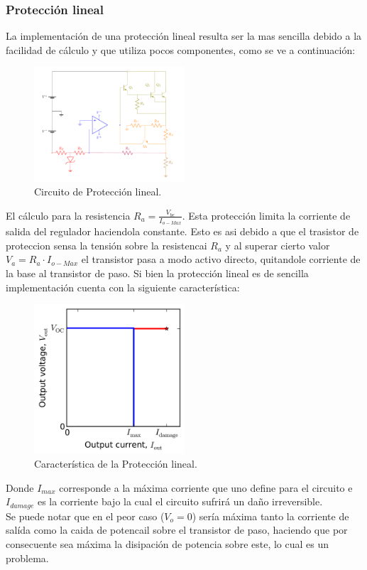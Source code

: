 \subsubsection{Protección lineal}
La implementación de una protección lineal resulta ser la mas sencilla debido a la facilidad de cálculo y que utiliza pocos componentes, como se ve a continuación:
\begin{figure}[H]
\centering
	\includegraphics[width=0.5\textwidth, page=3]{ImagenesEjercicio2/Regulador.pdf}
	\caption{Circuito de Protección lineal.}
	\label{fig:circuitolineal}
\end{figure}

El cálculo para la resistencia $R_a= \frac{V_{be}}{I_{o-Max}}$.
Esta protección limita la corriente de salida del regulador haciendola constante. Esto es asi debido a que el trasistor de proteccion sensa la tensión sobre la resistencai $R_a$ y al superar cierto valor $V_a = R_a \cdot I_{o-Max} $ el transistor pasa a modo activo directo, quitandole corriente de la base al transistor de paso.
Si bien la protección lineal es de sencilla implementación cuenta con la siguiente característica:
\begin{figure}[H]
\centering
	\includegraphics[width=0.5\textwidth]{ImagenesEjercicio2/Linearprotection.png}
	\caption{Característica de la Protección lineal.}
	\label{fig:circuitolinealcarac}
\end{figure}
Donde $I_{max}$ corresponde a la máxima corriente que uno define para el circuito e $I_{damage}$ es la corriente bajo la cual el circuito sufrirá un daño irreversible.\\
Se puede notar que en el  peor caso ($V_o = 0$) sería máxima tanto la corriente de salída como la caida de potencail sobre el transistor de paso, haciendo que por consecuente sea máxima la disipación de potencia sobre este, lo cual es un problema.
